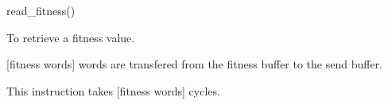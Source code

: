 

\format
read\_fitness()

\purpose

To retrieve a fitness value.

\description

[fitness words] words are transfered from the fitness buffer to the send buffer.

\notes

This instruction takes [fitness words] cycles.
